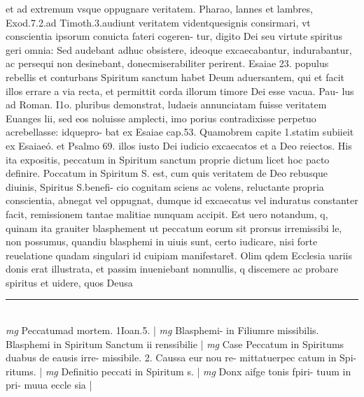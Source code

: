 \documentclass{article}
\begin{document}
\begin{pages}
et ad extremum vsque  oppugnare veritatem. Pharao, lannes et lambres, Exod.7.2.ad Timoth.3.audiunt veritatem videntquesignis consirmari, vt conscientia ipsorum conuicta fateri cogeren- tur, digito Dei seu virtute spiritus geri omnia: Sed audebant adhuc obsistere, ideoque  excaecabantur, indurabantur, ac persequi non desinebant, donecmiserabiliter perirent. Esaiae 23. populus rebellis et conturbans Spiritum sanctum habet Deum aduersantem, qui et facit illos errare a via recta, et permittit corda illorum timore Dei esse vacua. Pau- lus ad Roman. I1o. pluribus demonstrat, ludaeis annunciatam fuisse veritatem Euanges lii, sed eos noluisse amplecti, imo porius contradixisse perpetuo acrebellasse: idquepro- bat ex Esaiae cap.53. Quamobrem capite 1.statim subiieit ex Esaiaeó. et Psalmo 69. illos iusto Dei iudicio excaecatos et a Deo reiectos. His ita expositis, peccatum in Spiritum sanctum proprie dictum licet hoc pacto definire.  \pend\pstart Poccatum in Spiritum S. est, cum quis veritatem de Deo rebusque  diuinis, Spiritus S.benefi- cio cognitam sciens ac volens, reluctante propria conscientia, abnegat vel oppugnat, dumque  id excaecatus vel induratus constanter facit, remissionem tantae malitiae nunquam accipit. Est uero notandum, q, quinam ita grauiter blasphement ut peccatum eorum sit prorsus irremissibi le, non possumus, quandiu blasphemi in uiuis sunt, certo iudicare, nisi forte reuelatione quadam singulari id cuipiam manifestaret̃. Olim qdem Ecclesia uariis donis erat illustrata, et passim inueniebant nomnullis, q discemere ac probare spiritus et uidere, quos Deusa  \pend
\vspace{0.5cm}\noindent
\vspace{0.2cm}\rule{1cm}{0.2pt}\\ 
\hspace{0.2cm}\textit{mg}
\footnotesize Peccatumad mortem. 1Ioan.5. 
\normalsize| 
\hspace{0.2cm}\textit{mg}
\footnotesize Blasphemi- in Filiumre missibilis. Blasphemi in Spiritum Sanctum ii renssibilie 
\normalsize| 
\hspace{0.2cm}\textit{mg}
\footnotesize Case Peccatum in Spiritums duabus de eausis irre- missibile. 2. Caussa eur nou re- mittatuerpec catum in Spi- ritums. 
\normalsize| 
\hspace{0.2cm}\textit{mg}
\footnotesize Definitio peccati in Spiritum s. 
\normalsize| 
\hspace{0.2cm}\textit{mg}
\footnotesize Donx aifge tonis fpiri- tuum in pri- muua eccle sia 
\normalsize| 

\end{pages}
\end{document}
